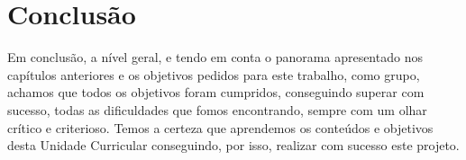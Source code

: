 \documentclass[11pt,a4paper]{report}
\begin{document}
\pagebreak
	\chapter{Conclusão}
    
    Em conclusão, a nível geral, e tendo em conta o panorama apresentado nos capítulos anteriores e os objetivos pedidos para este trabalho, como grupo, achamos que todos os objetivos foram cumpridos, conseguindo superar com sucesso, todas as dificuldades que fomos encontrando,  sempre com um olhar crítico e criterioso. Temos a certeza que aprendemos os conteúdos e objetivos desta Unidade Curricular conseguindo, por isso, realizar com sucesso este projeto.
	
\end{document}
